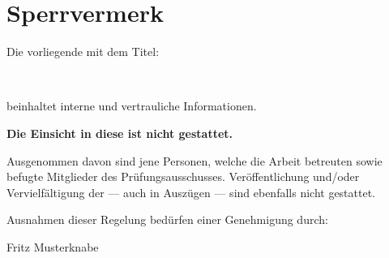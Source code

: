 \section*{Sperrvermerk}

Die vorliegende \arbeit mit dem Titel:\medskip

\hfill\parbox{0.95\textwidth}{%
	\textbf{\Projekttitel}\\
	\small\Projektuntertitel}\medskip

beinhaltet interne und vertrauliche Informationen.\medskip

\textbf{Die Einsicht in diese \arbeit ist nicht gestattet.}\medskip

Ausgenommen davon sind jene Personen, welche die Arbeit betreuten sowie befugte Mitglieder des Prüfungsausschusses. 
Veröffentlichung und/oder Vervielfältigung der \arbeit --- auch in Auszügen --- sind ebenfalls nicht gestattet.\medskip

Ausnahmen dieser Regelung bedürfen einer Genehmigung durch:\medskip

Fritz Musterknabe
\clearpage
